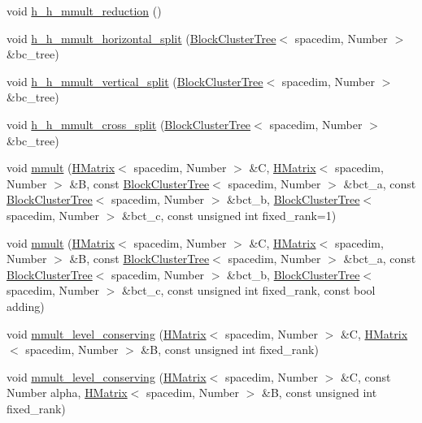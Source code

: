\begin{DoxyCompactItemize}
\item 
void \hyperlink{classHMatrix_a168b6eea2e5b27528497850bf5ee2bbe}{h\+\_\+h\+\_\+mmult\+\_\+reduction} ()
\item 
void \hyperlink{classHMatrix_a38c88893c6ca784d4e56653d8b0e3e67}{h\+\_\+h\+\_\+mmult\+\_\+horizontal\+\_\+split} (\hyperlink{classBlockClusterTree}{Block\+Cluster\+Tree}$<$ spacedim, Number $>$ \&bc\+\_\+tree)
\item 
void \hyperlink{classHMatrix_a253c23d09e89a9a37a7d808374b5ae4e}{h\+\_\+h\+\_\+mmult\+\_\+vertical\+\_\+split} (\hyperlink{classBlockClusterTree}{Block\+Cluster\+Tree}$<$ spacedim, Number $>$ \&bc\+\_\+tree)
\item 
void \hyperlink{classHMatrix_ab315324e3ece178943f406823f792746}{h\+\_\+h\+\_\+mmult\+\_\+cross\+\_\+split} (\hyperlink{classBlockClusterTree}{Block\+Cluster\+Tree}$<$ spacedim, Number $>$ \&bc\+\_\+tree)
\item 
void \hyperlink{classHMatrix_af40d53aabc8bec86fa543638d48ba64e}{mmult} (\hyperlink{classHMatrix}{H\+Matrix}$<$ spacedim, Number $>$ \&C, \hyperlink{classHMatrix}{H\+Matrix}$<$ spacedim, Number $>$ \&B, const \hyperlink{classBlockClusterTree}{Block\+Cluster\+Tree}$<$ spacedim, Number $>$ \&bct\+\_\+a, const \hyperlink{classBlockClusterTree}{Block\+Cluster\+Tree}$<$ spacedim, Number $>$ \&bct\+\_\+b, \hyperlink{classBlockClusterTree}{Block\+Cluster\+Tree}$<$ spacedim, Number $>$ \&bct\+\_\+c, const unsigned int fixed\+\_\+rank=1)
\item 
void \hyperlink{classHMatrix_a4139e9069e3b18d4719c527ce2e0414c}{mmult} (\hyperlink{classHMatrix}{H\+Matrix}$<$ spacedim, Number $>$ \&C, \hyperlink{classHMatrix}{H\+Matrix}$<$ spacedim, Number $>$ \&B, const \hyperlink{classBlockClusterTree}{Block\+Cluster\+Tree}$<$ spacedim, Number $>$ \&bct\+\_\+a, const \hyperlink{classBlockClusterTree}{Block\+Cluster\+Tree}$<$ spacedim, Number $>$ \&bct\+\_\+b, \hyperlink{classBlockClusterTree}{Block\+Cluster\+Tree}$<$ spacedim, Number $>$ \&bct\+\_\+c, const unsigned int fixed\+\_\+rank, const bool adding)
\item 
void \hyperlink{classHMatrix_a4ea0317bff2670e3ed7e48416f908873}{mmult\+\_\+level\+\_\+conserving} (\hyperlink{classHMatrix}{H\+Matrix}$<$ spacedim, Number $>$ \&C, \hyperlink{classHMatrix}{H\+Matrix}$<$ spacedim, Number $>$ \&B, const unsigned int fixed\+\_\+rank)
\item 
void \hyperlink{classHMatrix_aefdb7dbcff58654f53a149b94e545bf7}{mmult\+\_\+level\+\_\+conserving} (\hyperlink{classHMatrix}{H\+Matrix}$<$ spacedim, Number $>$ \&C, const Number alpha, \hyperlink{classHMatrix}{H\+Matrix}$<$ spacedim, Number $>$ \&B, const unsigned int fixed\+\_\+rank)

\end{DoxyCompactItemize}
